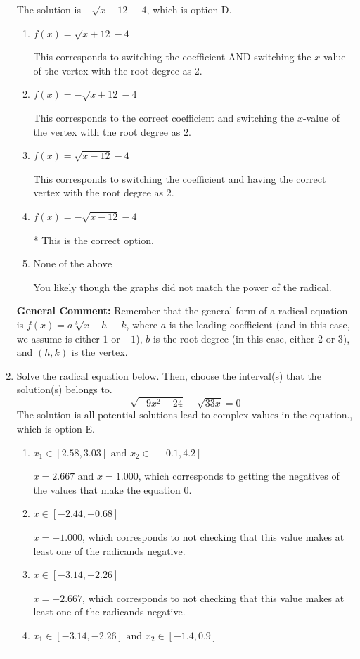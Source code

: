 \documentclass{extbook}[14pt]
\newcommand{\litem}[1]{\item #1

\rule{\textwidth}{0.4pt}}
\begin{document}
\begin{enumerate}
{The solution is \( - \sqrt{x - 12} - 4 \), which is option D.\begin{enumerate}[label=\Alph*.]
\item \( f(x) = \sqrt{x + 12} - 4 \)

This corresponds to switching the coefficient AND switching the $x$-value of the vertex with the root degree as $2$.
\item \( f(x) = - \sqrt{x + 12} - 4 \)

This corresponds to the correct coefficient and switching the $x$-value of the vertex with the root degree as $2$.
\item \( f(x) = \sqrt{x - 12} - 4 \)

This corresponds to switching the coefficient and having the correct vertex with the root degree as $2$.
\item \( f(x) = - \sqrt{x - 12} - 4 \)

* This is the correct option.
\item \( \text{None of the above} \)

You likely though the graphs did not match the power of the radical.
\end{enumerate}

\textbf{General Comment:} Remember that the general form of a radical equation is $ f(x) = a \sqrt[b]{x - h} + k$, where $a$ is the leading coefficient (and in this case, we assume is either $1$ or $-1$), $b$ is the root degree (in this case, either $2$ or $3$), and $(h, k)$ is the vertex.
}
\litem{
Solve the radical equation below. Then, choose the interval(s) that the solution(s) belongs to.
\[ \sqrt{-9 x^2 - 24} - \sqrt{33 x} = 0 \]The solution is \( \text{all potential solutions lead to complex values in the equation.} \), which is option E.\begin{enumerate}[label=\Alph*.]
\item \( x_1 \in [2.58, 3.03] \text{ and } x_2 \in [-0.1,4.2] \)

$x = 2.667 \text{ and } x = 1.000$, which corresponds to getting the negatives of the values that make the equation 0.
\item \( x \in [-2.44,-0.68] \)

$x = -1.000$, which corresponds to not checking that this value makes at least one of the radicands negative.
\item \( x \in [-3.14,-2.26] \)

$x = -2.667$, which corresponds to not checking that this value makes at least one of the radicands negative.
\item \( x_1 \in [-3.14, -2.26] \text{ and } x_2 \in [-1.4,0.9] \)


\end{enumerate}}
\end{enumerate}
\end{document}
